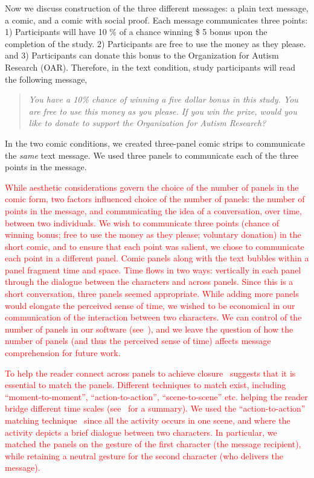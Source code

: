 Now we discuss construction of the three different messages: a plain text message, a comic, and a comic with social proof. Each message communicates three points: 1) Participants will have 10 \% of a chance winning \$ 5 bonus upon the completion of the study. 2) Participants are free to use the money as they please. and 3) Participants can donate this bonus to the Organization for Autism Research (OAR). Therefore, in the text condition, study participants will read the following message,
\begin{quote}
  \textit{You have a 10\% chance of winning a five dollar bonus in this study. You are free to use this money as you please. If you win the prize, would you like to donate to support the Organization for Autism Research?}
\end{quote}

In the two comic conditions, we created three-panel comic strips to communicate the \textit{same} text message. We used three panels to communicate each of the three points in the message. 

\textcolor{red}{While aesthetic considerations govern the choice of the number of panels in the comic form, two factors influenced choice of the number of panels: the number of points in the message, and communicating the idea of a conversation, over time, between two individuals. We wish to communicate three points (chance of winning bonus; free to use the money as they please; voluntary donation) in the short comic, and to ensure that each point was salient, we chose to communicate each point in a different panel. Comic panels along with the text bubbles within a panel fragment time and space. Time flows in two ways: vertically in each panel through the dialogue between the characters and across panels. Since this is a short conversation, three panels seemed appropriate. While adding more panels would elongate the perceived sense of time, we wished to be economical in our communication of the interaction between two characters. We can control of the number of panels in our software (see~), and we leave the question of how the number of panels (and thus the perceived sense of time) affects message comprehension for future work.}

\textcolor{red}{To help the reader connect across panels to achieve closure~\textcite[][Chapter 3]{scott1993understanding} suggests that it is essential to match the panels. Different techniques to match exist, including ``moment-to-moment'', ``action-to-action'', ``scene-to-scene'' etc. helping the reader bridge different time scales (see~\parencite[][p. 71]{scott1993understanding} for a summary). We used the ``action-to-action'' matching technique~\cite{scott1993understanding} since all the activity occurs in one scene, and where the activity depicts a brief dialogue between two characters. In particular, we matched the panels on the gesture of the first character (the message recipient), while retaining a neutral gesture for the second character (who delivers the message). }



